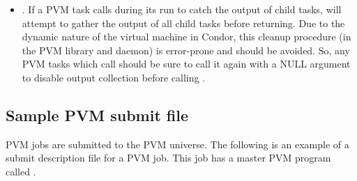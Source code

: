 \begin{itemize}
\item {}.  If a PVM task calls 
  during its run to catch the output of child tasks,
   will attempt to gather the output of all child
  tasks before returning.  Due to the dynamic nature of the virtual
  machine in Condor, this cleanup procedure (in the PVM library and
  daemon) is error-prone and should be avoided.  So, any PVM tasks
  which call  should be sure to call it again
  with a NULL argument to disable output collection before calling
  .

\end{itemize}

\subsection{\label{sec:PVM-Submit}Sample PVM submit file}

PVM jobs are submitted to the PVM universe.
The following is an
example of a submit description file for a PVM job.  
This job has a master PVM program called .

